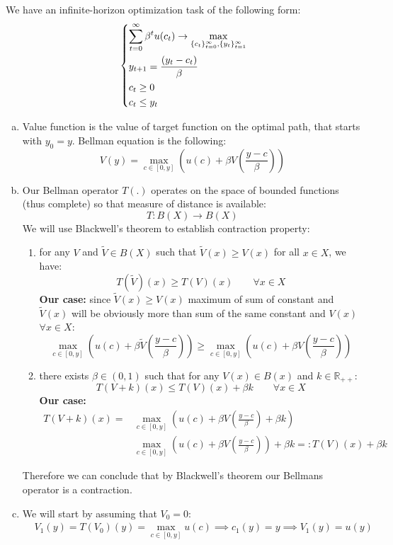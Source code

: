 \documentclass[11pt, oneside]{article}
\renewcommand{\b}{\beta}
\begin{document}
We have an infinite-horizon optimization task of the following form:
\[
\begin{dcases}
	\sum_{t=0}^{\infty} \b^{t}u(c_{t}) \to \max_{\{c_{t}\}_{t=0}^{\infty}, \{y_{t}\}_{t=1}^{\infty}} \\
	y_{t+1} = \frac{(y_{t} -c_{t})}{\b} \\
	c_{t} \ge 0 \\
	c_{t} \le y_{t}
\end{dcases}
\]
\begin{enumerate}[(a)]
	\item Value function is the value of target function on the optimal path, that starts with $ y_{0} = y $. Bellman equation is the following:
	\[
	V(y) = \max_{c\in[0, y]}\left( u(c) + \b V \left(\frac{y-c}{\b}\right)\right)
	\]
	\item Our Bellman operator $ T(.) $ operates on the space of bounded functions (thus complete) so that measure of distance is available:
	\[T: B(X) \to B(X)\]
	We will use Blackwell's theorem to establish contraction property:
	\begin{enumerate}[(1)]
		\item for any $ V $ and $ \tilde{V} \in B(X)$ such that $ \tilde{V}(x) \ge V(x)$ for all $ x\in X $, we have:
		\[
		T(\tilde{V})(x)\ge T(V)(x) \quad\quad \forall x\in X
		\]
		\textbf{Our case:} since $ \tilde{V}(x) \ge V(x) $ maximum of sum of constant and $ \tilde{V}(x) $ will be obviously more than sum of the same constant and $ V(x) $ $ \forall x\in X$:
		\[
		\max_{c\in[0, y]}\left( u(c) + \b \tilde{V} \left(\frac{y-c}{\b}\right)\right) \ge \max_{c\in[0, y]}\left( u(c) + \b V \left(\frac{y-c}{\b}\right)\right)
		\]
		\item there exists $ \b \in (0, 1) $ such that for any $ V(x)\in B(x) $ and $ k \in \mathbb{R}_{++} $:
		\[
		T(V + k)(x) \le T(V)(x) + \b k \quad\quad \forall x \in X
		\]
		\textbf{Our case:}
		\begin{align*}
		T(V + k)(x) = &\max_{c\in[0, y]}\left( u(c) + \b V \left(\frac{y-c}{\b}\right) + \b k \right) \\
		&\max_{c\in[0, y]}\left( u(c) + \b V \left(\frac{y-c}{\b}\right)\right) + \b k =: T(V)(x) + \b k
		\end{align*}
	\end{enumerate}
Therefore we can conclude that by Blackwell's theorem our Bellmans operator is a contraction.
\item We will start by assuming that $ V_{0} = 0 $:
\begin{align*}
	&V_{1}(y) = T(V_{0})(y) = \max_{c\in [0, y]} u(c) \implies c_{1}(y) = y \implies V_{1}(y) = u(y) \\

\end{align*}
\end{enumerate}
\end{document}
